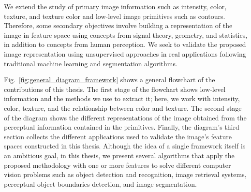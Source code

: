 
%
We extend the study of primary image information such as intensity, color, texture, and texture color and low-level image primitives such as contours. Therefore, some secondary objectives involve building a representation of the image in feature space using concepts from signal theory, geometry, and statistics, in addition to concepts from human perception. We seek to validate the proposed image representation using unsupervised approaches in real applications following traditional machine learning and segmentation algorithms.

Fig.\ \ref{fig:general_diagram_framework} shows a general flowchart of the contributions of this thesis. The first stage of the flowchart shows low-level information and the methods we use to extract it; here, we work with intensity, color, texture, and the relationship between color and texture. The second stage of the diagram shows the different representations of the image obtained from the perceptual information contained in the primitives. Finally, the diagram's third section collects the different applications used to validate the image's feature spaces constructed in this thesis. Although the idea of a single framework itself is an ambitious goal, in this thesis, we present several algorithms that apply the proposed methodology with one or more features to solve different computer vision problems such as object detection and recognition, image retrieval systems, perceptual object boundaries detection, and image segmentation.


